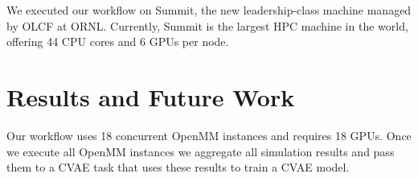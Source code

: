 \documentclass[conference,final]{IEEEtran}
\begin{document}
We executed our workflow on Summit, the new leadership-class machine managed
by OLCF at ORNL\@. Currently, Summit is the largest HPC machine in the world,
offering 44 CPU cores and 6 GPUs per node.


\section{Results and Future Work}

Our workflow uses 18 concurrent OpenMM instances and requires 18 GPUs. Once
we execute all OpenMM instances we aggregate all simulation results and pass
them to a CVAE task that uses these results to train a CVAE model.



\end{document}

